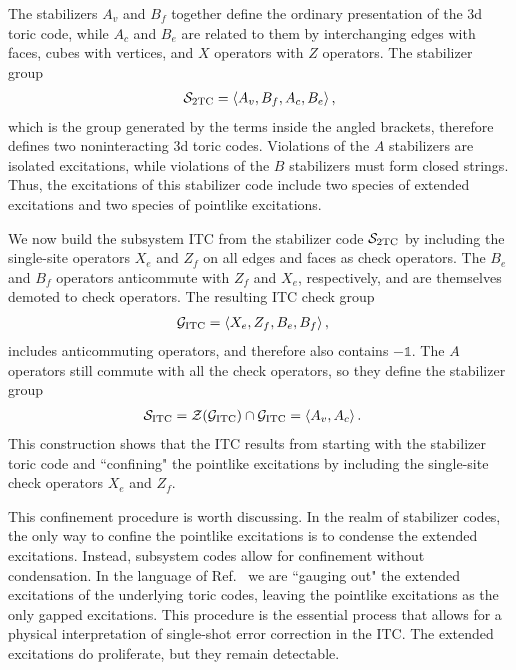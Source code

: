 The stabilizers $A_v$ and $B_f$ together define the ordinary presentation of the 3d toric code, while $A_c$ and $B_e$ are related to them by interchanging edges with faces, cubes with vertices, and $X$ operators with $Z$ operators.
The stabilizer group
\begin{align}
\S_\text{2TC} = \left \langle A_v, B_f, A_c, B_e \right \rangle, \label{eqn:S-2TC}
\end{align}
which is the group generated by the terms inside the angled brackets, therefore defines two noninteracting 3d toric codes.
Violations of the $A$ stabilizers are isolated excitations, while violations of the $B$ stabilizers must form closed strings.
Thus, the excitations of this stabilizer code include two species of extended excitations and two species of pointlike excitations.

We now build the subsystem ITC from the stabilizer code $\S_\TTC$ by including the single-site operators $X_e$ and $Z_f$ on all edges and faces as check operators. The $B_e$ and $B_f$ operators anticommute with $Z_f$ and $X_e$, respectively, and are themselves demoted to check operators. The resulting ITC check group
\begin{align}
\cal{G}_\ITC &= \left \langle X_e, Z_f, B_e, B_f \right \rangle, \label{eqn:checks-toric}
\end{align}
includes anticommuting operators, and therefore also contains $-\mathbb{1}$. The $A$ operators still commute with all the check operators, so they define the stabilizer group
\begin{align}
\cal{S}_\ITC &= \Z(\cal{G}_\ITC) \cap \G_\ITC = \left \langle A_v, A_c \right\rangle. \label{eqn:stabilizers}
\end{align}
This construction shows that the ITC results from starting with the stabilizer toric code and ``confining" the pointlike excitations by including the single-site check operators $X_e$ and $Z_f$. 

This confinement procedure is worth discussing. In the realm of stabilizer codes, the only way to confine the pointlike excitations is to condense the extended excitations. Instead, subsystem codes allow for confinement without condensation. In the language of Ref.~\cite{Ellison2022Subsystem} we are ``gauging out" the extended excitations of the underlying toric codes, leaving the pointlike excitations as the only gapped excitations. This procedure is the essential process that allows for a physical interpretation of single-shot error correction in the ITC. The extended excitations do proliferate, but they remain detectable.


